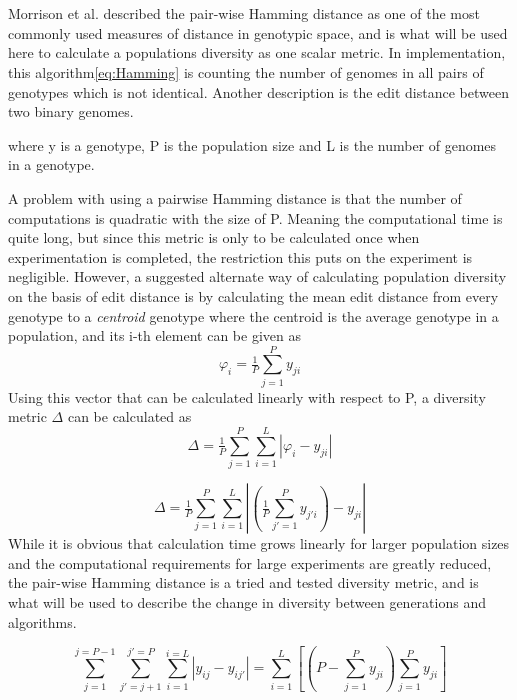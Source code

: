 \chapter{}
 Morrison et al.\cite{populationDiversity} described the pair-wise Hamming distance as one of the most commonly used measures of distance in genotypic space, and is what will be used here to calculate a populations diversity as one scalar metric. In implementation, this algorithm\ref{eq:Hamming} is counting the number of genomes in all pairs of genotypes which is not identical. Another description is the edit distance between two binary genomes. 


where y is a genotype, P is the population size and L is the number of genomes in a genotype.

A problem with using a pairwise Hamming distance is that the number of computations is quadratic with the size of P. Meaning the computational time is quite long, but since this metric is only to be calculated once when experimentation is completed, the restriction this puts on the experiment is negligible. However, a suggested alternate way of calculating population diversity on the basis of edit distance is by calculating the mean edit distance from every genotype to a \textit{centroid} genotype where the centroid is the average genotype in a population, and its i-th element can be given as  
\begin{equation}
    \label{eq:centroid}
    \varphi_{i}=\tfrac{1}{P}\sum_{j=1}^{P}y_{ji}
\end{equation}
Using this vector that can be calculated linearly with respect to P, a diversity metric \(\Delta\) can be calculated as 
\begin{equation*}
    \Delta = \tfrac{1}{P}\sum_{j=1}^{P}\sum_{i=1}^{L}\left | \varphi_{i}-y_{ji} \right |
\end{equation*}

\begin{equation}
    \label{eq:homemade diversity}
    \Delta = \tfrac{1}{{P}}\sum_{j=1}^{P}\sum_{i=1}^{L}\left | (\tfrac{1}{{P}}\sum_{{j}'=1}^{P}y_{{j}'i})-y_{ji} \right |
\end{equation}
While it is obvious that calculation time grows linearly for larger population sizes and the computational requirements for large experiments are greatly reduced, the pair-wise Hamming distance is a tried and tested diversity metric, and is what will be used to describe the change in diversity between generations and algorithms. 

\begin{equation}
    \label{eq:linearHamming}
    \sum_{j=1}^{j=P-1}\sum_{{j}'=j+1}^{{j}'=P}\sum_{i=1}^{i=L}\left |y_{ij}-y_{i{j}'}\right | = \sum_{i=1}^{L}\left [ \left (  P-\sum_{j=1}^{P}y_{ji} \right )\sum_{j=1}^{P}y_{ji} \right ]
\end{equation}


